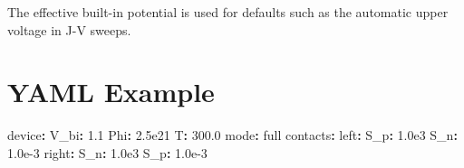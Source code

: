 \documentclass[
  11pt,
  american,
]{report}
\newenvironment{Shaded}{}{}
\newcommand{\AttributeTok}[1]{\textcolor[rgb]{0.49,0.56,0.16}{#1}}
\newcommand{\FloatTok}[1]{\textcolor[rgb]{0.25,0.63,0.44}{#1}}
\newcommand{\FunctionTok}[1]{\textcolor[rgb]{0.02,0.16,0.49}{#1}}
\newcommand{\KeywordTok}[1]{\textcolor[rgb]{0.00,0.44,0.13}{\textbf{#1}}}
\begin{document}
The effective built-in potential is used for defaults such as the
automatic upper voltage in J-V sweeps.

\hypertarget{yaml-example}{%
\section{YAML Example}\label{yaml-example}}

\begin{Shaded}
\begin{Highlighting}[]
\FunctionTok{device}\KeywordTok{:}
\AttributeTok{  }\FunctionTok{V\_bi}\KeywordTok{:}\AttributeTok{ }\FloatTok{1.1}
\AttributeTok{  }\FunctionTok{Phi}\KeywordTok{:}\AttributeTok{ }\FloatTok{2.5e21}
\AttributeTok{  }\FunctionTok{T}\KeywordTok{:}\AttributeTok{ }\FloatTok{300.0}
\AttributeTok{  }\FunctionTok{mode}\KeywordTok{:}\AttributeTok{ full}
\AttributeTok{  }\FunctionTok{contacts}\KeywordTok{:}
\AttributeTok{    }\FunctionTok{left}\KeywordTok{:}
\AttributeTok{      }\FunctionTok{S\_p}\KeywordTok{:}\AttributeTok{ }\FloatTok{1.0e3}
\AttributeTok{      }\FunctionTok{S\_n}\KeywordTok{:}\AttributeTok{ }\FloatTok{1.0e{-}3}
\AttributeTok{    }\FunctionTok{right}\KeywordTok{:}
\AttributeTok{      }\FunctionTok{S\_n}\KeywordTok{:}\AttributeTok{ }\FloatTok{1.0e3}
\AttributeTok{      }\FunctionTok{S\_p}\KeywordTok{:}\AttributeTok{ }\FloatTok{1.0e{-}3}


\end{Highlighting}
\end{Shaded}
\end{document}
